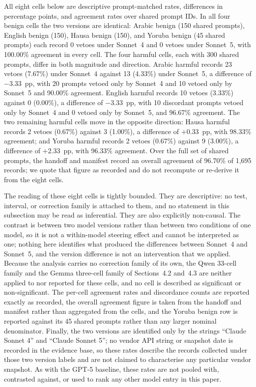 All eight cells below are descriptive prompt-matched rates, differences in
percentage points, and agreement rates over shared prompt IDs. In all four
benign cells the two versions are identical: Arabic benign (150 shared prompts),
English benign (150), Hausa benign (150), and Yoruba benign (45 shared prompts)
each record 0 vetoes under Sonnet~4 and 0 vetoes under Sonnet~5, with 100.00\%
agreement in every cell. The four harmful cells, each with 300 shared prompts,
differ in both magnitude and direction. Arabic harmful records 23 vetoes
(7.67\%) under Sonnet~4 against 13 (4.33\%) under Sonnet~5, a difference of
$-3.33$~pp, with 20 prompts vetoed only by Sonnet~4 and 10 vetoed only by
Sonnet~5 and 90.00\% agreement. English harmful records 10 vetoes (3.33\%)
against 0 (0.00\%), a difference of $-3.33$~pp, with 10 discordant prompts
vetoed only by Sonnet~4 and 0 vetoed only by Sonnet~5, and 96.67\% agreement.
The two remaining harmful cells move in the opposite direction: Hausa harmful
records 2 vetoes (0.67\%) against 3 (1.00\%), a difference of $+0.33$~pp, with
98.33\% agreement; and Yoruba harmful records 2 vetoes (0.67\%) against 9
(3.00\%), a difference of $+2.33$~pp, with 96.33\% agreement. Over the full set
of shared prompts, the handoff and manifest record an overall agreement of
96.70\% of 1{,}695 records; we quote that figure as recorded and do not
recompute or re-derive it from the eight cells.

The reading of these eight cells is tightly bounded. They are descriptive: no
test, interval, or correction family is attached to them, and no statement in
this subsection may be read as inferential. They are also explicitly non-causal.
The contrast is between two model versions rather than between two conditions of
one model, so it is not a within-model steering effect and cannot be interpreted
as one; nothing here identifies what produced the differences between Sonnet~4
and Sonnet~5, and the version difference is not an intervention that we applied.
Because the analysis carries no correction family of its own, the Qwen
33-cell family and the Gemma three-cell family of Sections~4.2 and~4.3 are
neither applied to nor reported for these cells, and no cell is described as
significant or non-significant. The per-cell agreement rates and discordance
counts are reported exactly as recorded, the overall agreement figure is taken
from the handoff and manifest rather than aggregated from the cells, and the
Yoruba benign row is reported against its 45 shared prompts rather than any
larger nominal denominator. Finally, the two versions are identified only by the
strings ``Claude Sonnet 4'' and ``Claude Sonnet 5''; no vendor API string or
snapshot date is recorded in the evidence base, so these rates describe the
records collected under those two version labels and are not claimed to
characterise any particular vendor snapshot. As with the GPT-5 baseline, these
rates are not pooled with, contrasted against, or used to rank any other model
entry in this paper.

